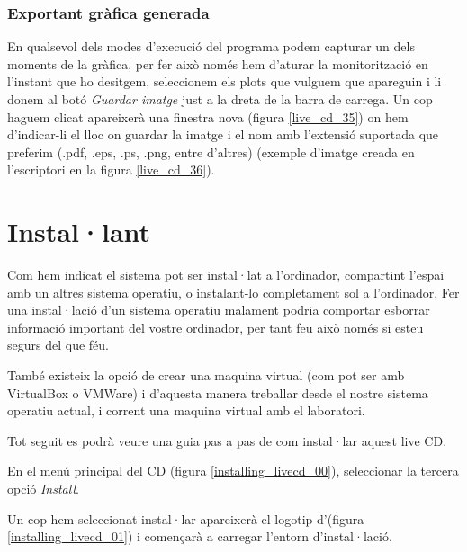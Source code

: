 \subsubsection{Exportant gràfica generada}\label{cap:gui:cd:dcsmonitor:image}

En qualsevol dels modes d'execució del programa podem capturar un dels moments de la gràfica, per fer això només hem d'aturar la monitorització en l'instant que ho desitgem, seleccionem els plots que vulguem que apareguin i li donem al botó \emph{Guardar imatge} just a la dreta de la barra de carrega. Un cop haguem clicat apareixerà una finestra nova (figura \ref{live_cd_35}) on hem d'indicar-li el lloc on guardar la imatge i el nom amb l'extensió suportada que preferim (.pdf, .eps, .ps, .png, entre d'altres) (exemple d'imatge creada en l'escriptori en la figura \ref{live_cd_36}).



\section{Instal·lant}\label{cap:gui:cd:inst}

Com hem indicat el sistema pot ser instal·lat a l'ordinador, compartint l'espai amb un altres sistema operatiu, o instalant-lo completament sol a l'ordinador. Fer una instal·lació d'un sistema operatiu malament podria comportar esborrar informació important del vostre ordinador, per tant feu això només si esteu segurs del que féu.

També existeix la opció de crear una maquina virtual (com pot ser amb VirtualBox o VMWare) i d'aquesta manera treballar desde el nostre sistema operatiu actual, i corrent una maquina virtual amb el laboratori.

Tot seguit es podrà veure una guia pas a pas de com instal·lar aquest live CD.

En el menú principal del CD (figura \ref{installing_livecd_00}), seleccionar la tercera opció \emph{Install}.


Un cop hem seleccionat instal·lar apareixerà el logotip d'\Ubuntu (figura \ref{installing_livecd_01}) i començarà a carregar l'entorn d'instal·lació.

